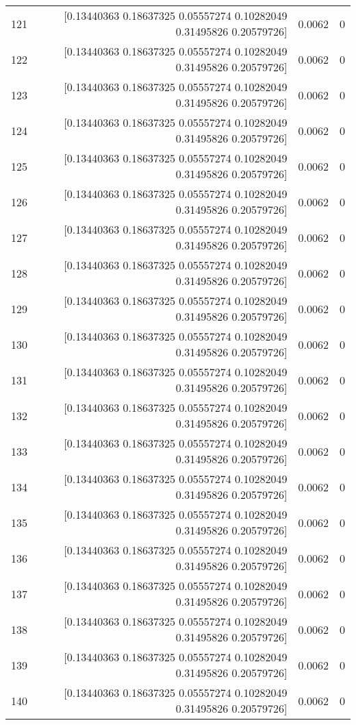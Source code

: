 \begin{longtable}{lrrr}
121 & [0.13440363 0.18637325 0.05557274 0.10282049 0.31495826 0.20579726] & 0.0062 & 0 \\
122 & [0.13440363 0.18637325 0.05557274 0.10282049 0.31495826 0.20579726] & 0.0062 & 0 \\
123 & [0.13440363 0.18637325 0.05557274 0.10282049 0.31495826 0.20579726] & 0.0062 & 0 \\
124 & [0.13440363 0.18637325 0.05557274 0.10282049 0.31495826 0.20579726] & 0.0062 & 0 \\
125 & [0.13440363 0.18637325 0.05557274 0.10282049 0.31495826 0.20579726] & 0.0062 & 0 \\
126 & [0.13440363 0.18637325 0.05557274 0.10282049 0.31495826 0.20579726] & 0.0062 & 0 \\
127 & [0.13440363 0.18637325 0.05557274 0.10282049 0.31495826 0.20579726] & 0.0062 & 0 \\
128 & [0.13440363 0.18637325 0.05557274 0.10282049 0.31495826 0.20579726] & 0.0062 & 0 \\
129 & [0.13440363 0.18637325 0.05557274 0.10282049 0.31495826 0.20579726] & 0.0062 & 0 \\
130 & [0.13440363 0.18637325 0.05557274 0.10282049 0.31495826 0.20579726] & 0.0062 & 0 \\
131 & [0.13440363 0.18637325 0.05557274 0.10282049 0.31495826 0.20579726] & 0.0062 & 0 \\
132 & [0.13440363 0.18637325 0.05557274 0.10282049 0.31495826 0.20579726] & 0.0062 & 0 \\
133 & [0.13440363 0.18637325 0.05557274 0.10282049 0.31495826 0.20579726] & 0.0062 & 0 \\
134 & [0.13440363 0.18637325 0.05557274 0.10282049 0.31495826 0.20579726] & 0.0062 & 0 \\
135 & [0.13440363 0.18637325 0.05557274 0.10282049 0.31495826 0.20579726] & 0.0062 & 0 \\
136 & [0.13440363 0.18637325 0.05557274 0.10282049 0.31495826 0.20579726] & 0.0062 & 0 \\
137 & [0.13440363 0.18637325 0.05557274 0.10282049 0.31495826 0.20579726] & 0.0062 & 0 \\
138 & [0.13440363 0.18637325 0.05557274 0.10282049 0.31495826 0.20579726] & 0.0062 & 0 \\
139 & [0.13440363 0.18637325 0.05557274 0.10282049 0.31495826 0.20579726] & 0.0062 & 0 \\
140 & [0.13440363 0.18637325 0.05557274 0.10282049 0.31495826 0.20579726] & 0.0062 & 0 \\

\end{longtable}
